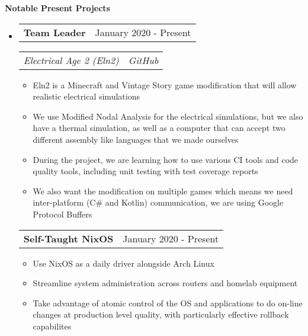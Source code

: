 \documentclass[letterpaper,12pt]{article}
\makeatletter
\newcommand{\resitem}[1]{\item #1 \vspace{-3pt}}
\newcommand{\resheading}[1]{{\large {\textbf{#1 \vphantom{p\^{E}}}}}\vspace{-3pt}}
\newcommand{\topheading}[2]{
\begin{tabular*}{6.5in}{l@{\extracolsep{\fill}}r}
		\textbf{#1} & #2 \\
\end{tabular*}}
\newcommand{\bottomheading}[2]{
\begin{tabular*}{6.5in}{l@{\extracolsep{\fill}}r}
		\textit{#1} & \textit{#2} \\
\end{tabular*}\vspace{-6pt}}
\newcommand{\singleheading}[2]{
\vspace{6pt}
\begin{tabular*}{6.5in}{l@{\extracolsep{\fill}}r}
		\textbf{#1} & #2 \\
\end{tabular*}
\vspace{-3pt}
}
\makeatother
\begin{document}
\resheading{Notable Present Projects}
\begin{itemize}
	\item[]

	\topheading{Team Leader}{January 2020 - Present}
	\bottomheading{Electrical Age 2 (Eln2)}{GitHub}
	\begin{itemize}
		\resitem{Eln2 is a Minecraft and Vintage Story game modification that will allow realistic electrical simulations}
		\resitem{We use Modified Nodal Analysis for the electrical simulations, but we also have a thermal simulation, as well as a computer that can accept two different assembly like languages that we made ourselves}
		\resitem{During the project, we are learning how to use various CI tools and code quality tools, including unit testing with test coverage reports}
		\resitem{We also want the modification on multiple games which means we need inter-platform (C\# and Kotlin) communication, we are using Google Protocol Buffers}
	\end{itemize}

	\singleheading{Self-Taught NixOS}{January 2020 - Present}
	\begin{itemize}
		\resitem{Use NixOS as a daily driver alongside Arch Linux}
		\resitem{Streamline system administration across routers and homelab equipment}
		\resitem{Take advantage of atomic control of the OS and applications to do on-line changes at production level quality, with particularly effective rollback capabilites}
	\end{itemize}

\end{itemize}


\newpage
\end{document}
